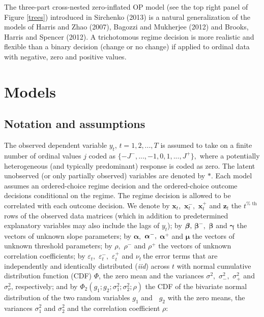 \documentclass[letterpaper,fleqn,12pt]{article}
\begin{document}
The three-part cross-nested zero-inflated OP model (see the top right panel
of Figure \ref{trees}) introduced in Sirchenko (2013) is a natural
generalization of the models of Harris and Zhao (2007), Bagozzi and
Mukherjee (2012) and Brooks, Harris and Spencer (2012). A trichotomous
regime decision is more realistic and flexible than a binary decision
(change or no change) if applied to ordinal data with negative, zero and
positive values.

\section{\noindent Models}

\subsection{Notation and assumptions}

The observed dependent variable $y_{t}$, $t=1,2,...,T$ is assumed to take on
a finite number of ordinal values $j$ coded as $%
\{-J^{-},...,-1,0,1,...,J^{+}\},$ where a potentially heterogeneous (and
typically predominant) response is coded as zero. The latent unobserved (or
only partially observed) variables are denoted by $\ast $. Each model
assumes an ordered-choice regime decision and the ordered-choice outcome
decisions conditional on the regime. The regime decision is allowed to be
correlated with each outcome decision. We denote by $\mathbf{x}_{t},$ $%
\mathbf{x}_{t}^{-},$ $\mathbf{x}_{t}^{+}$ and $\mathbf{z}_{t}$ the $t^{\text{%
th}}$ rows of the observed data matrices (which in addition to predetermined
explanatory variables may also include the lags of $y_{t}$); by $\mathbf{%
\beta ,}$ $\mathbf{\beta }^{-},$ $\mathbf{\beta }$ and $\mathbf{\gamma }$
the vectors of unknown slope parameters; by $\mathbf{\alpha ,}$ $\mathbf{%
\alpha }^{-}\mathbf{,}$ $\mathbf{\alpha }^{+}$ and $\mathbf{\mu }$ the
vectors of unknown threshold parameters; by $\rho ,$ $\rho ^{-}$ and $\rho
^{+}$ the vectors of unknown correlation coefficients; by $\varepsilon _{t},$
$\varepsilon _{t}^{-},$ $\varepsilon _{t}^{+}$ and $\nu _{t}\ $the error
terms that are independently and identically distributed (\textit{iid})
across $t$ with normal cumulative distribution function (CDF) $\Phi $, the
zero mean and the variances $\sigma ^{2},$ $\sigma _{-}^{2},$ $\sigma
_{+}^{2}$ and $\sigma _{\nu }^{2}$, respectively; and by $\Phi _{2}(g_{1}%
\mathbf{;}g_{2}\mathbf{;}\sigma _{1}^{2};\sigma _{2}^{2};\rho )$ the CDF of
the bivariate normal distribution of the two random variables $g_{1}$ and%
\textbf{\ }$g_{2}$ with the zero means, the variances $\sigma _{1}^{2}$ and $%
\sigma _{2}^{2}$ and the correlation coefficient $\rho $:
\end{document}
